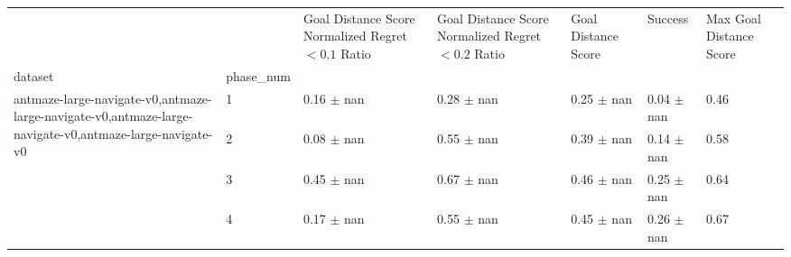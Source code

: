 \begin{tabular}{lllllll}
\toprule
 &  & Goal Distance Score Normalized Regret $< 0.1$ Ratio & Goal Distance Score Normalized Regret $< 0.2$ Ratio & Goal Distance Score & Success & Max Goal Distance Score \\
dataset & phase_num &  &  &  &  &  \\
\midrule
\multirow[t]{4}{*}{antmaze-large-navigate-v0,antmaze-large-navigate-v0,antmaze-large-navigate-v0,antmaze-large-navigate-v0} & 1 & 0.16 $\pm$ nan & 0.28 $\pm$ nan & 0.25 $\pm$ nan & 0.04 $\pm$ nan & 0.46 \\
 & 2 & 0.08 $\pm$ nan & 0.55 $\pm$ nan & 0.39 $\pm$ nan & 0.14 $\pm$ nan & 0.58 \\
 & 3 & 0.45 $\pm$ nan & 0.67 $\pm$ nan & 0.46 $\pm$ nan & 0.25 $\pm$ nan & 0.64 \\
 & 4 & 0.17 $\pm$ nan & 0.55 $\pm$ nan & 0.45 $\pm$ nan & 0.26 $\pm$ nan & 0.67 \\
\cline{1-7}
\bottomrule
\end{tabular}
